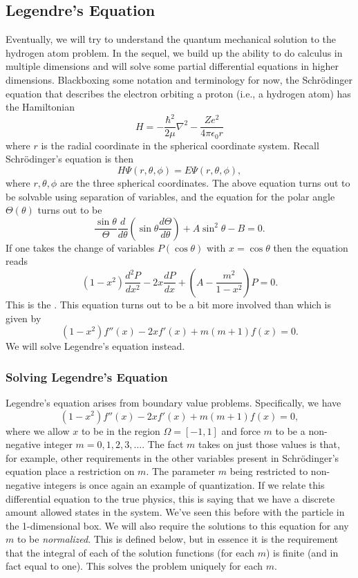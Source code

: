 \subsection{Legendre's Equation}

Eventually, we will try to understand the quantum mechanical solution to the hydrogen atom problem.  In the sequel, we build up the ability to do calculus in multiple dimensions and will solve some partial differential equations in higher dimensions.  Blackboxing some notation and terminology for now, the Schr\"odinger equation that describes the electron orbiting a proton (i.e., a hydrogen atom) has the Hamiltonian
\[
H=-\frac{\hbar^2}{2\mu} \nabla^2 - \frac{Ze^2}{4\pi \epsilon_0 r}
\]
where $r$ is the radial coordinate in the spherical coordinate system.  Recall Schr\"odinger's equation is then
\[
H\Psi(r,\theta, \phi) = E\Psi(r, \theta, \phi),
\]
where $r,\theta,\phi$ are the three spherical coordinates. The above equation turns out to be solvable using separation of variables, and the equation for the polar angle $\Theta(\theta)$ turns out to be
\[
\frac{\sin \theta}{\Theta} \frac{d}{d\theta}\left( \sin \theta \frac{d\Theta}{d\theta}\right) +A \sin^2 \theta - B = 0.
\]
If one takes the change of variables $P(\cos \theta)$ with $x=\cos \theta$ then the equation reads
\[
(1-x^2)\frac{d^2P}{dx^2}-2x\frac{dP}{dx}+\left(A-\frac{m^2}{1-x^2}\right)P=0.
\]
This is the .  This equation turns out to be a bit more involved than  which is given by
\[
(1-x^2)f''(x)-2xf'(x)+m(m+1)f(x)=0.
\]
We will solve Legendre's equation instead.

\subsubsection{Solving Legendre's Equation}

Legendre's equation arises from boundary value problems. Specifically, we have
\[
(1-x^2)f''(x)-2xf'(x)+m(m+1)f(x)=0,
\]
where we allow $x$ to be in the region $\Omega = [-1,1]$ and force $m$ to be a non-negative integer $m=0,1,2,3,\dots$.  The fact $m$ takes on just those values is that, for example, other requirements in the other variables present in Schr\"odinger's equation place a restriction on $m$. The parameter $m$ being restricted to non-negative integers is once again an example of quantization.  If we relate this differential equation to the true physics, this is saying that we have a discrete amount allowed states in the system.  We've seen this before with the particle in the 1-dimensional box.  We will also require the solutions to this equation for any $m$ to be \emph{normalized}. This is defined below, but in essence it is the requirement that the integral of each of the solution functions (for each $m$) is finite (and in fact equal to one).  This solves the problem uniquely for each $m$.

